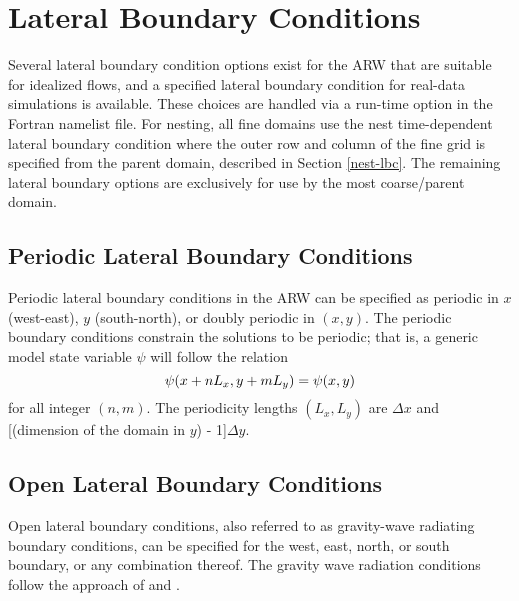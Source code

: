\chapter{Lateral Boundary Conditions}
\label{lbc_chap}

Several lateral boundary condition options exist for the ARW 
that are suitable for idealized flows, and a specified lateral boundary
condition for real-data simulations is available.  These choices are
handled via a run-time option in the Fortran namelist file.
For nesting, all fine domains use the 
nest time-dependent lateral boundary condition where the outer row and column of the
fine grid is specified from the parent domain, described in 
Section \ref{nest-lbc}.
The remaining lateral boundary options are exclusively 
for use by the most coarse/parent domain.

\section{Periodic Lateral Boundary Conditions}

Periodic lateral boundary conditions in the ARW can be specified as
periodic in $x$ (west-east), $y$ (south-north), or doubly periodic in
$(x,y)$.  The periodic boundary conditions constrain the solutions to be
periodic; that is, a generic model state variable $\psi$ will follow
the relation 
% 
\begin{equation} \psi(x+nL_x,y+mL_y) = \psi(x,y)
\notag
\end{equation} 
% 
\noindent for all integer $(n,m)$.
The periodicity lengths $(L_x,L_y)$ are \hfil{}$\Delta x$ and
[(dimension of the domain in $y$) - 1]$\Delta y$.

\section{Open Lateral Boundary Conditions}

Open lateral boundary conditions, also referred to as gravity-wave
radiating boundary conditions, can be specified for the west, east, 
north, or south boundary, or any combination thereof.  
The gravity wave radiation conditions follow the approach of 
\citet{klemp_and_lilly78} and \citet{klemp78}.

